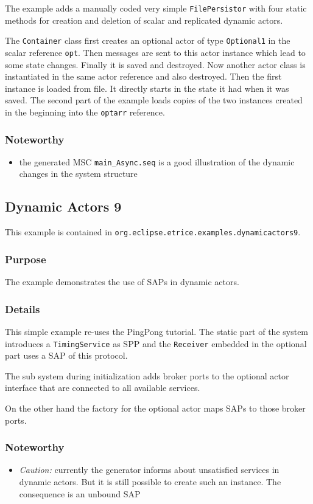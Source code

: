 The example adds a manually coded very simple \texttt{FilePersistor} with four static methods for creation and deletion of scalar and replicated
dynamic actors.

The \texttt{Container} class first creates an optional actor of type \texttt{Optional1} in the scalar reference \texttt{opt}.
Then messages are sent to this actor instance which lead to some state changes. Finally it is saved and destroyed.
Now another actor class is instantiated in the same actor reference and also destroyed. Then the first instance is loaded from file.
It directly starts in the state it had when it was saved. The second part of the example loads copies of the two
instances created in the beginning into the \texttt{optarr} reference.

\subsubsection{Noteworthy}

\begin{itemize}
\item the generated MSC \texttt{main\_Async.seq} is a good illustration of the dynamic changes in the system structure
\end{itemize}

\subsection{Dynamic Actors 9}

This example is contained in \texttt{org.eclipse.etrice.examples.dynamicactors9}.

\subsubsection{Purpose}

The example demonstrates the use of SAPs in dynamic actors.

\subsubsection{Details}

This simple example re-uses the PingPong tutorial. The static part of the system introduces a \texttt{TimingService} as SPP
and the \texttt{Receiver} embedded in the optional part uses a SAP of this protocol.

The sub system during initialization adds broker ports to the optional actor interface that are connected to all available
services.

On the other hand the factory for the optional actor maps SAPs to those broker ports.

\subsubsection{Noteworthy}

\begin{itemize}
\item \emph{Caution:} currently the generator informs about unsatisfied services in dynamic actors. But it is still possible to create such an
instance. The consequence is an unbound SAP
\end{itemize}
